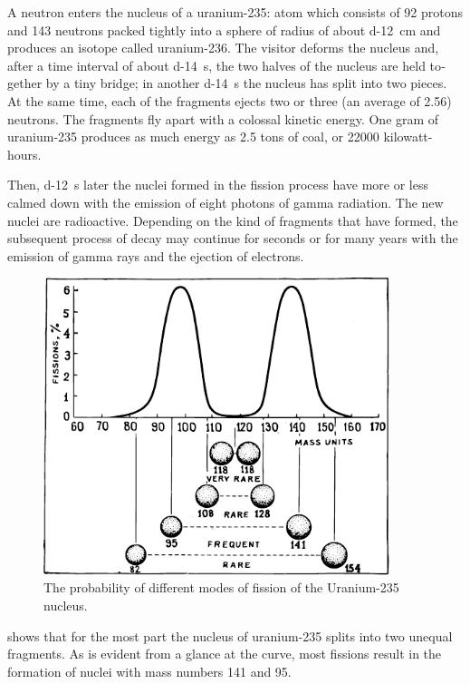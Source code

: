 A neutron enters the nucleus of a uranium-235: atom which consists of 92 protons and 143 neutrons packed tightly into a sphere of radius of about \SI{d-12}{\centi\meter} and produces an isotope called uranium-236. The visitor de­forms the nucleus and, after a time interval of about \SI{d-14}{\second}, the two halves of the nucleus are held to­gether by a tiny bridge; in another \SI{d-14}{\second} the nu­cleus has split into two pieces. At the same time, each of the fragments ejects two or three (an average of 2.56) neutrons. The fragments fly apart with a colossal kinetic energy. One gram of uranium-235 produces as much energy as 2.5 tons of coal, or \num{22000} kilowatt-hours.

Then, \SI{d-12}{\second} later the nuclei formed in the fission process have more or less calmed down with the emission of eight photons of gamma radiation. The new nuclei are radioactive. Depending on the kind of fragments that have formed, the subsequent process of decay may con­tinue for seconds or for many years with the emission
of gamma rays and the ejection of electrons.

\begin{figure}[!ht]
\centering
\includegraphics[width=0.9\textwidth]{figures/fig-05-07.pdf}
\caption{The probability of different modes of fission of the Uranium-235 nucleus.}
\label{fig-5.7}
\end{figure}

 shows that for the most part the nucleus of uranium-235 splits into two unequal fragments. As is evident from a glance at the curve, most fissions result in the formation of nuclei with mass numbers 141 and 95.

